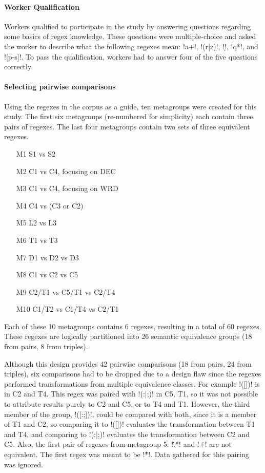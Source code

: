 \paragraph{Worker Qualification}
Workers qualified to participate in the study by answering questions regarding some basics of regex knowledge. These questions were multiple-choice and asked the worker to describe what the following regexes mean: \cverb!a+!, \cverb!(r|z)!, \cverb!\d!, \cverb!q*!, and \cverb![p-s]!. To pass the qualification, workers had to answer four of the five questions correctly.

\paragraph{Selecting pairwise comparisons}

 Using the regexes in the corpus as a guide, ten metagroups were created for this study.  The first six metagroups (re-numbered for simplicity) each contain three pairs of regexes.  The last four metagroups contain two sets of three equivalent regexes.

\begin{multicols}{2}
\begin{itemize}[noitemsep,topsep=0pt]
\item[M1] S1 vs S2
\item[M2] C1 vs C4, focusing on DEC
\item[M3] C1 vs C4, focusing on WRD
\item[M4] C4 vs (C3 or C2)
\item[M5] L2 vs L3
\item[M6]  T1 vs T3
\item[M7]  D1 vs D2 vs D3
\item[M8]  C1 vs C2 vs C5
\item[M9]  C2/T1 vs C5/T1 vs C2/T4
\item[M10] C1/T2 vs C1/T4 vs C2/T1
\end{itemize}
\end{multicols}

Each of these 10 metagroups contains 6 regexes, resulting in a total of 60 regexes.  These regexes are logically partitioned into 26 semantic equivalence groups (18 from pairs, 8 from triples).

Although this design provides 42 pairwise comparisons (18 from pairs, 24 from triples),  six comparisons had to be dropped due to a design flaw since the regexes performed transformations from multiple equivalence classes. For example \cverb!([])! is in C2 and T4.  This regex was paired with \cverb!(:|;)! in C5, T1, so it was not possible to attribute results purely to C2 and C5, or to T4 and T1. However, the third member of the group, \cverb!([:;])!, could be compared with both, since it is a member of T1 and C2, so comparing it to \cverb!([])! evaluates the transformation between T1 and T4, and comparing to \cverb!(:|;)! evaluates the transformation between C2 and C5.  Also, the first pair of regexes from metagroup 5: \cverb!\..*! and \cverb!\.+! are not equivalent.  The first regex was meant to be \cverb!\.\.*!.  Data gathered for this pairing was ignored.

